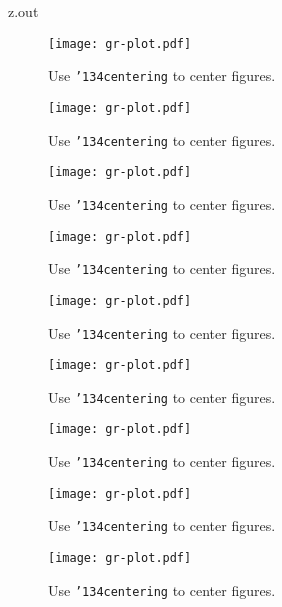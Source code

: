 \begin{VerbatimOut}{z.out}
\begin{figure}[ht]
  \centering
  \texttt{[image: gr-plot.pdf]}
  \caption{Use {\tt \char'134centering\/} to center figures.}
  \label{fi:centered}
\end{figure}

\begin{figure}[ht]
  \centering
  \texttt{[image: gr-plot.pdf]}
  \caption{Use {\tt \char'134centering\/} to center figures.}
  \label{fi:centered}
\end{figure}

\begin{figure}[ht]
  \centering
  \texttt{[image: gr-plot.pdf]}
  \caption{Use {\tt \char'134centering\/} to center figures.}
  \label{fi:centered}
\end{figure}

\begin{figure}[ht]
  \centering
  \texttt{[image: gr-plot.pdf]}
  \caption{Use {\tt \char'134centering\/} to center figures.}
  \label{fi:centered}
\end{figure}

\begin{figure}[ht]
  \centering
  \texttt{[image: gr-plot.pdf]}
  \caption{Use {\tt \char'134centering\/} to center figures.}
  \label{fi:centered}
\end{figure}

\begin{figure}[ht]
  \centering
  \texttt{[image: gr-plot.pdf]}
  \caption{Use {\tt \char'134centering\/} to center figures.}
  \label{fi:centered}
\end{figure}

\begin{figure}[ht]
  \centering
  \texttt{[image: gr-plot.pdf]}
  \caption{Use {\tt \char'134centering\/} to center figures.}
  \label{fi:centered}
\end{figure}

\begin{figure}[ht]
  \centering
  \texttt{[image: gr-plot.pdf]}
  \caption{Use {\tt \char'134centering\/} to center figures.}
  \label{fi:centered}
\end{figure}

\begin{figure}[ht]
  \centering
  \texttt{[image: gr-plot.pdf]}
  \caption{Use {\tt \char'134centering\/} to center figures.}
  \label{fi:centered}
\end{figure}


\end{VerbatimOut}
